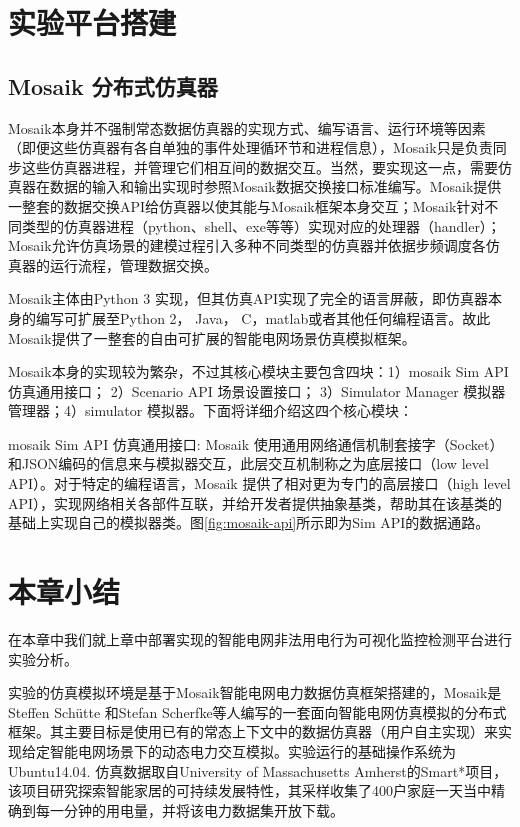 \section{实验平台搭建}

\subsection{Mosaik 分布式仿真器}



Mosaik本身并不强制常态数据仿真器的实现方式、编写语言、运行环境等因素（即便这些仿真器有各自单独的事件处理循环节和进程信息），Mosaik只是负责同步这些仿真器进程，并管理它们相互间的数据交互。当然，要实现这一点，需要仿真器在数据的输入和输出实现时参照Mosaik数据交换接口标准编写。Mosaik提供一整套的数据交换API给仿真器以使其能与Mosaik框架本身交互；Mosaik针对不同类型的仿真器进程（python、shell、exe等等）实现对应的处理器（handler）；Mosaik允许仿真场景的建模过程引入多种不同类型的仿真器并依据步频调度各仿真器的运行流程，管理数据交换。

Mosaik主体由Python 3 实现，但其仿真API实现了完全的语言屏蔽，即仿真器本身的编写可扩展至Python 2， Java， C，matlab或者其他任何编程语言。故此Mosaik提供了一整套的自由可扩展的智能电网场景仿真模拟框架。

Mosaik本身的实现较为繁杂，不过其核心模块主要包含四块：1）mosaik Sim API 仿真通用接口； 2）Scenario API 场景设置接口； 3）Simulator Manager 模拟器管理器；4）simulator 模拟器。下面将详细介绍这四个核心模块：

mosaik Sim API 仿真通用接口: Mosaik 使用通用网络通信机制套接字（Socket）和JSON编码的信息来与模拟器交互，此层交互机制称之为底层接口（low level API）。对于特定的编程语言，Mosaik 提供了相对更为专门的高层接口（high level API），实现网络相关各部件互联，并给开发者提供抽象基类，帮助其在该基类的基础上实现自己的模拟器类。图\ref{fig:mosaik-api}所示即为Sim API的数据通路。
    

\section{本章小结}

在本章中我们就上章中部署实现的智能电网非法用电行为可视化监控检测平台进行实验分析。

实验的仿真模拟环境是基于Mosaik智能电网电力数据仿真框架搭建的，Mosaik是Steffen Schütte 和Stefan Scherfke等人编写的一套面向智能电网仿真模拟的分布式框架。其主要目标是使用已有的常态上下文中的数据仿真器（用户自主实现）来实现给定智能电网场景下的动态电力交互模拟。实验运行的基础操作系统为Ubuntu14.04. 仿真数据取自University of Massachusetts Amherst的Smart*项目，该项目研究探索智能家居的可持续发展特性，其采样收集了400户家庭一天当中精确到每一分钟的用电量，并将该电力数据集开放下载。

